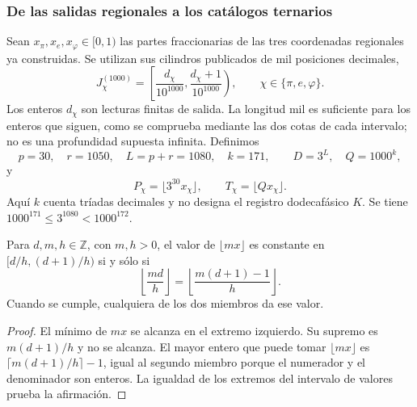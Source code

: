 \subsubsection{De las salidas regionales a los catálogos ternarios}

Sean \(x_\pi,x_e,x_\varphi\in[0,1)\) las partes fraccionarias de las
tres coordenadas regionales ya construidas. Se utilizan sus cilindros
publicados de mil posiciones decimales,
\[
 J_\chi^{(1000)}=
 \left[\frac{d_\chi}{10^{1000}},
       \frac{d_\chi+1}{10^{1000}}\right),
 \qquad \chi\in\{\pi,e,\varphi\}.
\]
Los enteros \(d_\chi\) son lecturas finitas de salida. La longitud mil
es suficiente para los enteros que siguen, como se comprueba mediante las
dos cotas de cada intervalo; no es una profundidad supuesta infinita.
Definimos
\begin{equation}
 p=30,\quad r=1050,\quad L=p+r=1080,\quad k=171,
 \qquad D=3^L,\quad Q=1000^k,
 \label{x_reciprocidad:censo:parametros}
\end{equation}
y
\[
 P_\chi=\lfloor3^{30}x_\chi\rfloor,\qquad
 T_\chi=\lfloor Qx_\chi\rfloor.
\]
Aquí \(k\) cuenta tríadas decimales y no designa el registro dodecafásico
\(K\). Se tiene \(1000^{171}\leq3^{1080}<1000^{172}\).

\begin{lemma}
\label{x_reciprocidad:censo:estabilidad}
Para \(d,m,h\in\mathbb Z\), con \(m,h>0\), el valor de
\(\lfloor mx\rfloor\) es constante en \([d/h,(d+1)/h)\) si y sólo si
\begin{equation}
 \left\lfloor\frac{md}{h}\right\rfloor
 =\left\lfloor\frac{m(d+1)-1}{h}\right\rfloor.
 \label{x_reciprocidad:censo:prueba-estabilidad}
\end{equation}
Cuando se cumple, cualquiera de los dos miembros da ese valor.
\end{lemma}
\begin{proof}
El mínimo de \(mx\) se alcanza en el extremo izquierdo. Su supremo
es \(m(d+1)/h\) y no se alcanza. El mayor entero que puede tomar
\(\lfloor mx\rfloor\) es
\(\lceil m(d+1)/h\rceil-1\), igual al segundo miembro porque
el numerador y el denominador son enteros. La igualdad de los extremos
del intervalo de valores prueba la afirmación.
\end{proof}

